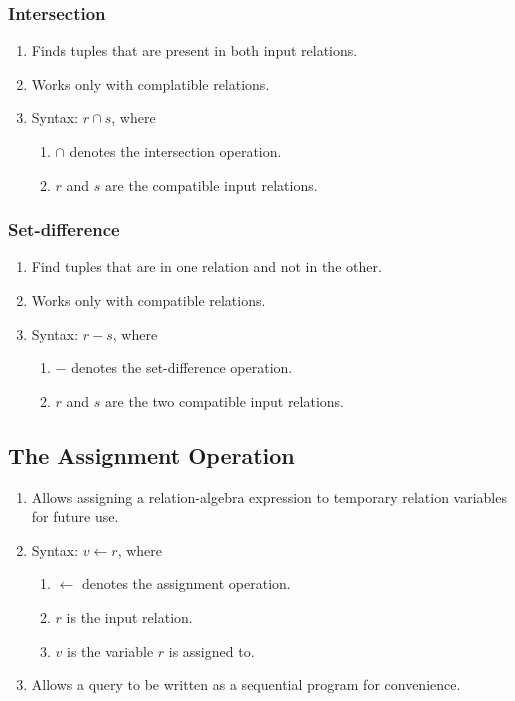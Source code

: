 \documentclass[journal,12pt,twocolumn]{IEEEtran}
\begin{document}
\subsubsection{Intersection}
\begin{enumerate}
    \item Finds tuples that are present in both input relations.
    \item Works only with complatible relations.
    \item Syntax: $r \cap s$, where
    \begin{enumerate}
        \item $\cap$ denotes the intersection operation.
        \item $r$ and $s$ are the compatible input relations.
    \end{enumerate}
\end{enumerate}
\subsubsection{Set-difference}
\begin{enumerate}
    \item Find tuples that are in one relation and not in the other.
    \item Works only with compatible relations.
    \item Syntax: $r - s$, where
    \begin{enumerate}
        \item $-$ denotes the set-difference operation.
        \item $r$ and $s$ are the two compatible input relations.
    \end{enumerate}
\end{enumerate}

\subsection{The Assignment Operation}
\begin{enumerate}
    \item Allows assigning a relation-algebra expression to temporary relation 
    variables for future use.
    \item Syntax: $v \leftarrow r$, where
    \begin{enumerate}
        \item $\leftarrow$ denotes the assignment operation.
        \item $r$ is the input relation.
        \item $v$ is the variable $r$ is assigned to.
    \end{enumerate}
    \item Allows a query to be written as a sequential program for convenience.
\end{enumerate}
\end{document}
